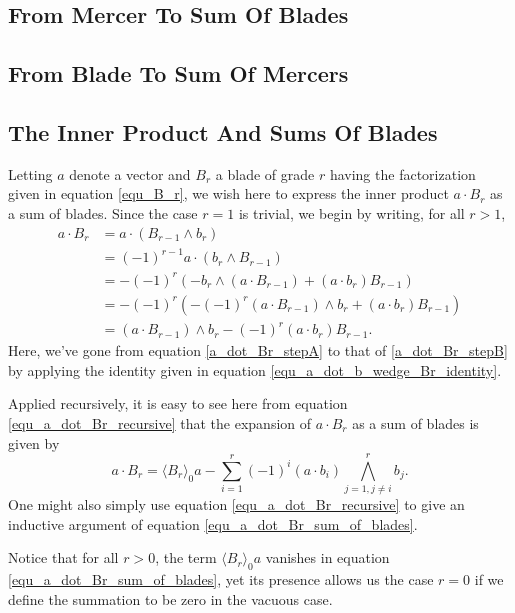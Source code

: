 \documentclass{birkjour}
\theoremstyle{definition}
\theoremstyle{remark}
\numberwithin{equation}{section}
\begin{document}
\subsection{From Mercer To Sum Of Blades}

\subsection{From Blade To Sum Of Mercers}

\subsection{The Inner Product And Sums Of Blades}

Letting $a$ denote a vector and $B_r$ a blade of grade $r$ having the factorization
given in equation \eqref{equ_B_r}, we wish here to express the inner product $a\cdot B_r$ as a sum of blades.
Since the case $r=1$ is trivial, we begin by writing, for all $r>1$,
\begin{align}
a\cdot B_r
 &= a\cdot(B_{r-1}\wedge b_r)\nonumber \\
 &= (-1)^{r-1}a\cdot(b_r\wedge B_{r-1})\label{a_dot_Br_stepA} \\
 &= -(-1)^r\left(-b_r\wedge(a\cdot B_{r-1})+(a\cdot b_r)B_{r-1}\right)\label{a_dot_Br_stepB} \\
 &= -(-1)^r\left(-(-1)^r(a\cdot B_{r-1})\wedge b_r+(a\cdot b_r)B_{r-1}\right)\nonumber \\
 &= (a\cdot B_{r-1})\wedge b_r - (-1)^r(a\cdot b_r)B_{r-1}.\label{equ_a_dot_Br_recursive}
\end{align}
Here, we've gone from equation \eqref{a_dot_Br_stepA} to that of \eqref{a_dot_Br_stepB} by
applying the identity given in equation \eqref{equ_a_dot_b_wedge_Br_identity}.

Applied recursively, it is easy to see here from equation \eqref{equ_a_dot_Br_recursive} that the expansion of
$a\cdot B_r$ as a sum of blades is given by
\begin{equation}\label{equ_a_dot_Br_sum_of_blades}
a\cdot B_r = \langle B_r\rangle_0a - \sum_{i=1}^r(-1)^i(a\cdot b_i)\bigwedge_{j=1,j\neq i}^r b_j.
\end{equation}
One might also simply use equation \eqref{equ_a_dot_Br_recursive} to give an inductive
argument of equation \eqref{equ_a_dot_Br_sum_of_blades}.

Notice that for all $r>0$, the term $\langle B_r\rangle_0a$ vanishes in equation \eqref{equ_a_dot_Br_sum_of_blades},
yet its presence allows us the case $r=0$ if we define the summation to be zero in the vacuous case.
\end{document}
